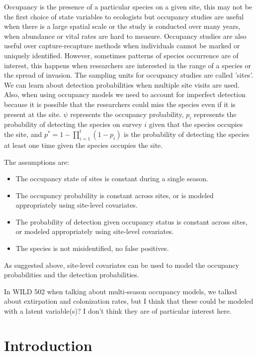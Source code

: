 \documentclass[12pt]{article}\usepackage[]{graphicx}\usepackage[]{color}
\begin{document}
Occupancy is the presence of a particular species on a given site, this may not be the first choice of state variables to ecologists but occupancy studies are useful when there is a large spatial scale or the study is conducted over many years, when abundance or vital rates are hard to measure. Occupancy studies are also useful over  capture-recapture methods when individuals cannot be marked or uniquely identified. However, sometimes patterns of species occurrence are of interest, this happens when researchers are interested in the range of a species or the spread of invasion. The sampling units for occupancy studies are called 'sites'. We can learn about detection probabilities when multiple site visits are used. Also, when using occupancy models we need to account for imperfect detection because it is possible that the researchers could miss the species even if it is present at the site. $\psi$ represents the occupancy probability, $p_i$ represents the probability of detecting the species on survey $i$ given that the species occupies the site, and $p^* = 1- \prod_{i = 1}^{t} (1-p_i)$ is the probability of detecting the species at least one time given the species occupies the site. 

The assumptions are: 
\begin{itemize}
\item The occupancy state of sites is constant during a single season. 
\item The occupancy probability is constant across sites, or is modeled appropriately using site-level covariates. 
\item The probability of detection given occupancy status is constant across sites, or modeled appropriately using site-level covariates. 
\item The species is not misidentified, no false positives. 
\end{itemize}

As suggested above, site-level covariates can be used to model the occupancy probabilities and the detection probabilities. 

In WILD 502 when talking about multi-season occupancy models, we talked about extirpation and colonization rates, but I think that these could be modeled with a latent variable(s)? I don't think they are of particular interest here. 

\section{Introduction}
\end{document}
